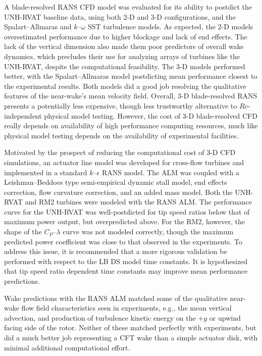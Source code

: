 A blade-resolved RANS CFD model was evaluated for its ability to postdict the
UNH-RVAT baseline data, using both 2-D and 3-D configurations, and the
Spalart--Allmaras and $k$--$\omega$ SST turbulence models. As expected, the 2-D
models overestimated performance due to higher blockage and lack of end effects.
The lack of the vertical dimension also made them poor predictors of overall
wake dynamics, which precludes their use for analyzing arrays of turbines like
the UNH-RVAT, despite the computational feasibility. The 3-D models performed
better, with the Spalart--Allmaras model postdicting mean performance closest to
the experimental results. Both models did a good job resolving the qualitative
features of the near-wake's mean velocity field. Overall, 3-D blade-resolved
RANS presents a potentially less expensive, though less trustworthy alternative
to $Re$-independent physical model testing. However, the cost of 3-D
blade-resolved CFD really depends on availability of high performance computing
resources, much like physical model testing depends on the availability of
experimental facilities.

Motivated by the prospect of reducing the computational cost of 3-D CFD
simulations, an actuator line model was developed for cross-flow turbines and
implemented in a standard $k$--$\epsilon$ RANS model. The ALM was coupled with a
Leishman--Beddoes type semi-empirical dynamic stall model, end effects
correction, flow curvature correction, and an added mass model. Both the
UNH-RVAT and RM2 turbines were modeled with the RANS ALM. The performance curve
for the UNH-RVAT was well-postdicted for tip speed ratios below that of maximum
power output, but overpredicted above. For the RM2, however, the shape of the
$C_P$--$\lambda$ curve was not modeled correctly, though the maximum predicted
power coefficient was close to that observed in the experiments. To address this
issue, it is recommended that a more rigorous validation be performed with
respect to the LB DS model time constants. It is hypothesized that tip speed
ratio dependent time constants may improve mean performance predictions.

Wake predictions with the RANS ALM matched some of the qualitative near-wake
flow field characteristics seen in experiments, e.g., the mean vertical
advection, and production of turbulence kinetic energy on the $+y$ or upwind
facing side of the rotor. Neither of these matched perfectly with experiments,
but did a much better job representing a CFT wake than a simple actuator disk,
with minimal additional computational effort.

